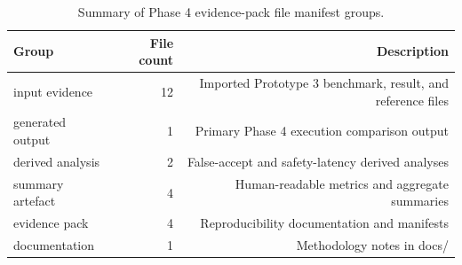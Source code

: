 \begin{table}[htbp]
\centering
\caption{Summary of Phase 4 evidence-pack file manifest groups.}
\label{tab:phase4_file_manifest_summary}
\begin{tabular}{lrr}
\hline
Group & File count & Description \\
\hline
input evidence & 12 & Imported Prototype 3 benchmark, result, and reference files \\
generated output & 1 & Primary Phase 4 execution comparison output \\
derived analysis & 2 & False-accept and safety-latency derived analyses \\
summary artefact & 4 & Human-readable metrics and aggregate summaries \\
evidence pack & 4 & Reproducibility documentation and manifests \\
documentation & 1 & Methodology notes in docs/ \\
\hline
\end{tabular}
\end{table}
